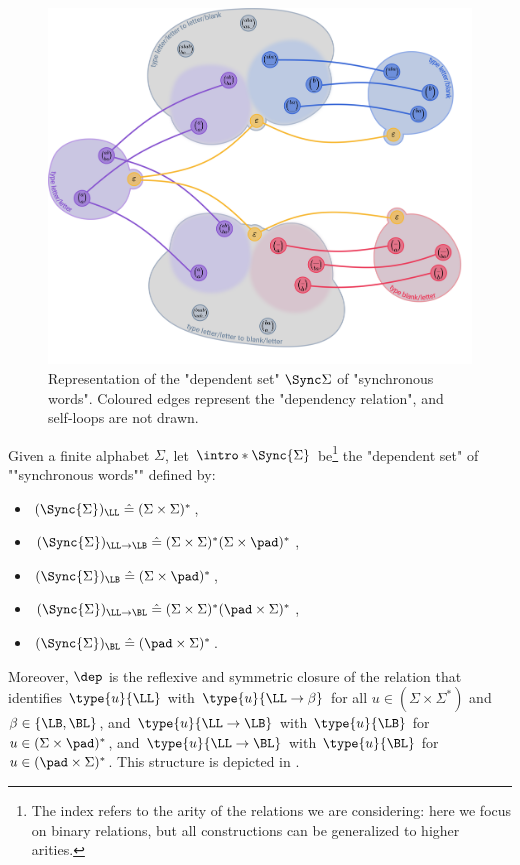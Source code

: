 \begin{figure}[htb]
	\begin{center}
		\includegraphics[width=\linewidth]{fig/algebra/free_algebras.png}
	\end{center}
	\caption{
		\AP\label{fig:free_algebras}
		Representation of the "dependent set" $\Sync\Sigma$ of "synchronous words".
		Coloured edges represent the "dependency relation", and self-loops are not drawn. 
	} 
\end{figure}
\begin{example}
	Given a finite alphabet $\Sigma$, let $\intro*\Sync{\Sigma}$ be\footnote{The index refers to the arity of the relations we are considering: here we focus on binary relations, but all constructions can be generalized to higher arities.} the "dependent set" of ""synchronous words"" defined by:
	\vspace{-1.25em}
	\begin{multicols}{2}
	\begin{itemize}
		\item $(\Sync{\Sigma})_{\LL} \defeq (\Sigma\times \Sigma)^*$,
		\item $(\Sync{\Sigma})_{\LL\to\LB} \defeq (\Sigma\times \Sigma)^*(\Sigma\times \pad)^*$,
		\item $(\Sync{\Sigma})_{\LB} \defeq (\Sigma\times \pad)^*$,
		\columnbreak
		\vfill
		\item $(\Sync{\Sigma})_{\LL\to\BL} \defeq (\Sigma\times \Sigma)^*(\pad\times \Sigma)^*$,
		\item $(\Sync{\Sigma})_{\BL} \defeq (\pad\times \Sigma)^*$.
	\end{itemize}
	\end{multicols}
	\vspace{-1em}
	Moreover, $\dep$ is the reflexive and symmetric closure of the relation that
	identifies $\type{u}{\LL}$ with $\type{u}{\LL\to\beta}$ for all
	$u \in (\Sigma\times\Sigma^*)$ and $\beta \in \{\LB,\BL\}$, 
	and $\type{u}{\LL\to\LB}$ with $\type{u}{\LB}$
	for $u \in (\Sigma\times\pad)^*$,
	and $\type{u}{\LL\to\BL}$ with $\type{u}{\BL}$
	for $u \in (\pad\times\Sigma)^*$.
	This structure is depicted in .
\end{example}

